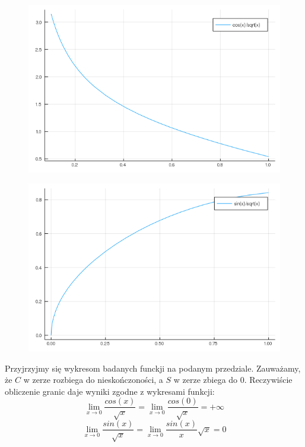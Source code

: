 \documentclass{article}
\begin{document}
\begin{figure}[ht]
    \includegraphics[scale=0.5]{WykresC.png}
    \label{wykresC}
\end{figure}
\begin{figure}[ht]
    \includegraphics[scale=0.5]{WykresS.png}
    \label{WykresS}
\end{figure}
Przyjrzyjmy się wykresom badanych funckji na podanym przedziale. Zauważamy, że $C$ w zerze rozbiega do nieskończoności, a $S$ w zerze zbiega do $0$. Reczywiście obliczenie granic daje wyniki zgodne z wykresami funkcji:
\begin{equation}
\lim_{x\to 0}  \frac{cos(x)}{\sqrt{x}} = \lim_{x\to 0} \frac{cos(0)}{\sqrt{x}} = +\infty
\end{equation}
\begin{equation}
\lim_{x\to 0}  \frac{sin(x)}{\sqrt{x}} = \lim_{x\to 0}  \frac{sin(x)}{x} \sqrt{x} = 0
\end{equation}
\end{document}
